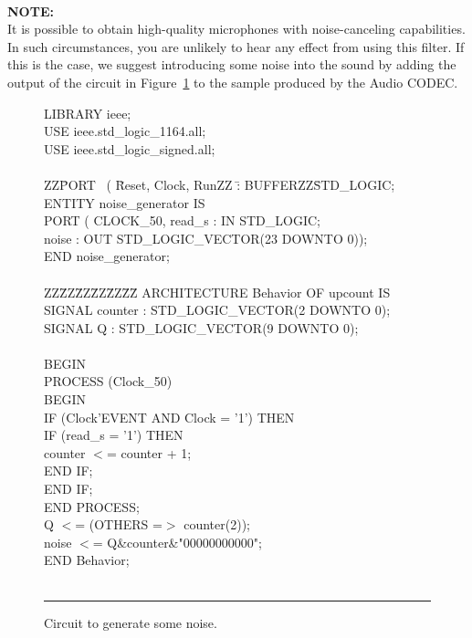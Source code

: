 \documentclass[epsfig,10pt,fullpage]{article}
\begin{document}
~\\
{\bf NOTE:}
~\\
It is possible to obtain high-quality microphones with noise-canceling capabilities. In such circumstances, you are unlikely
to hear any effect from using this filter. If this is the case, we suggest introducing some noise into the sound by adding
the output of the circuit in Figure~\ref{fig:noise_circuit} to the sample produced by the {\sf Audio CODEC}.

\begin{figure}[h]
\begin{center}
\begin{minipage}[t]{12.5 cm}
\begin{tabbing}
LIBRARY ieee;\\
USE ieee.std\_logic\_1164.all;\\
USE ieee.std\_logic\_signed.all;\\
~\\
ZZ\=PORT ~( \=Reset, Clock, RunZZ \=: BUFFERZZ\=STD\_LOGIC;\kill
ENTITY noise\_generator IS\\
\>PORT ( \>CLOCK\_50, read\_s \>:    IN \>STD\_LOGIC;\\
\>\>noise \>: OUT \>STD\_LOGIC\_VECTOR(23 DOWNTO 0));\\
END noise\_generator;\\
~\\
ZZ\=ZZ\=ZZ\=ZZ\=ZZ\=ZZ\=\kill
ARCHITECTURE Behavior OF upcount IS\\
\>SIGNAL counter : STD\_LOGIC\_VECTOR(2 DOWNTO 0);\\
\>SIGNAL Q : STD\_LOGIC\_VECTOR(9 DOWNTO 0);\\
~\\
BEGIN\\
\>PROCESS (Clock\_50)\\
\>BEGIN\\
\>\>IF (Clock'EVENT AND Clock = '1') THEN\\
\>\>\>IF (read\_s  = '1') THEN\\
\>\>\>\>counter $<$= counter + 1;\\
\>\>\>END IF;\\
\>\>END IF;\\
\>END PROCESS;\\
\>Q $<$= (OTHERS =$>$ counter(2));\\
\>noise $<$= Q\&counter\&"00000000000";\\
END Behavior;\\
~\rule{5.0in}{0in}
\end{tabbing}
\end{minipage}
\end{center}
\caption{Circuit to generate some noise.}
\label{fig:noise_circuit}
\end{figure}
\end{document}
